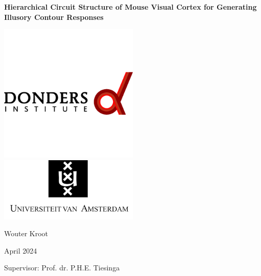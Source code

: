 \documentclass[12pt]{article}
\begin{document}
\captionsetup{font=small}

\begin{titlepage}
\centering

{\LARGE\bfseries Hierarchical Circuit Structure of Mouse Visual Cortex for Generating Illusory Contour Responses\par}

\vspace{5pt} %

\includegraphics[width=0.5\textwidth]{figures/donders_logo.png}
\includegraphics[width=0.5\textwidth]{figures/uva_logo.png}


\vspace{20pt} %

{\Large Wouter Kroot\par}
\vspace{5pt} %
{\Large April 2024\par}
\vspace{5pt}
{\Large Supervisor: Prof. dr. P.H.E. Tiesinga}

\end{titlepage}

\newpage
\end{document}
